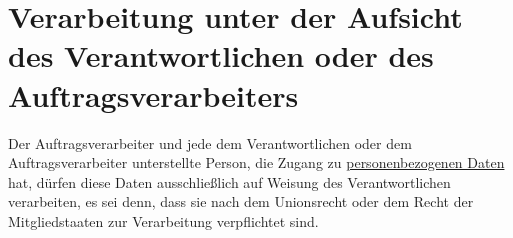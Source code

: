 \chapter{Verarbeitung unter der Aufsicht des Verantwortlichen oder des Auftragsverarbeiters}
\label{ch:29}


Der Auftragsverarbeiter und jede dem Verantwortlichen oder dem Auftragsverarbeiter unterstellte Person, die Zugang zu
\hyperref[itm:04-1]{personenbezogenen Daten} hat, dürfen diese Daten ausschließlich auf Weisung des Verantwortlichen verarbeiten, es sei
denn, dass sie nach dem Unionsrecht oder dem Recht der Mitgliedstaaten zur Verarbeitung verpflichtet sind.


